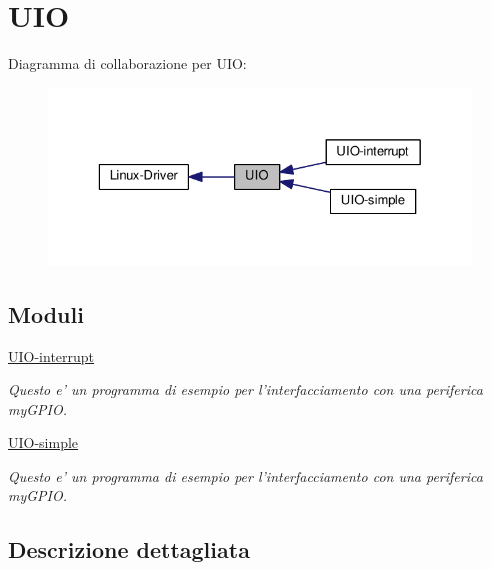 \hypertarget{group___u_i_o}{\section{U\+I\+O}
\label{group___u_i_o}
}
Diagramma di collaborazione per U\+I\+O\+:\nopagebreak
\begin{figure}[H]
\begin{center}
\leavevmode
\includegraphics[width=329pt]{group___u_i_o}
\end{center}
\end{figure}
\subsection*{Moduli}
\begin{DoxyCompactItemize}
\item 
\hyperlink{group___u_i_o-interrupt}{U\+I\+O-\/interrupt}
\begin{DoxyCompactList}\small\item\em Questo e' un programma di esempio per l'interfacciamento con una periferica my\+G\+P\+I\+O. \end{DoxyCompactList}\item 
\hyperlink{group___u_i_o-simple}{U\+I\+O-\/simple}
\begin{DoxyCompactList}\small\item\em Questo e' un programma di esempio per l'interfacciamento con una periferica my\+G\+P\+I\+O. \end{DoxyCompactList}\end{DoxyCompactItemize}


\subsection{Descrizione dettagliata}
